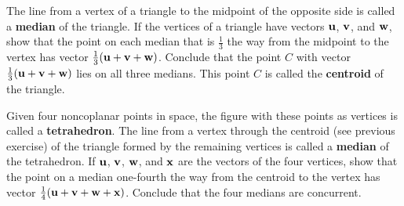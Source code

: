 \begin{multicols}{2}
\begin{ex}
The line from a vertex of a triangle to the midpoint of the opposite side is called a \textbf{median} of the triangle. If the vertices of a triangle have vectors $\textbf{u}$, $\textbf{v}$, and $\textbf{w}$, show that the point on each median that is $\frac{1}{3}$ the way from the midpoint to the vertex has vector $\tfrac{1}{3}(\textbf{u} + \textbf{v} + \textbf{w})$. Conclude that the point $C$ with vector $\tfrac{1}{3}(\textbf{u} + \textbf{v} + \textbf{w})$ lies on all three medians. This point $C$ is called the \textbf{centroid} of the triangle.
\end{ex}

\begin{ex}
Given four noncoplanar points in space, the figure with these points as vertices is called a \textbf{tetrahedron}.
 The line from a vertex through the centroid (see previous exercise) of 
the triangle formed by the remaining vertices is called a \textbf{median} of the tetrahedron. If $\textbf{u}$, $\textbf{v}$, $\textbf{w}$, and $\textbf{x}$ are the vectors of the four vertices, show that the point on a median one-fourth the way from the centroid to the vertex has vector $\tfrac{1}{4}(\textbf{u} + \textbf{v} + \textbf{w} + \textbf{x})$. Conclude that the four medians are concurrent.
\end{ex}
\end{multicols}


